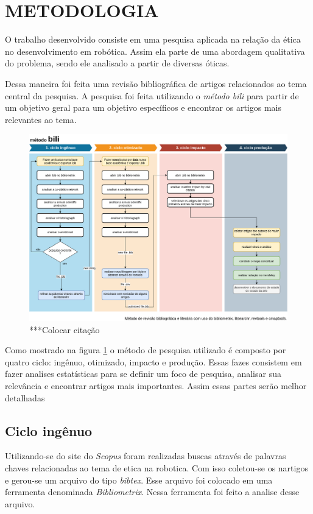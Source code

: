 \section{METODOLOGIA}

O trabalho desenvolvido consiste em uma pesquisa aplicada na relação da ética no desenvolvimento em robótica. Assim ela parte de uma abordagem qualitativa do problema, sendo ele analisado a partir de diversas óticas.

Dessa maneira foi feita uma revisão bibliográfica de artigos relacionados ao tema central da pesquisa. A pesquisa foi feita utilizando o \textit{método bili} para partir de um objetivo geral para um objetivo específicos e encontrar os artigos mais relevantes ao tema.  

\begin{figure}[h!]
   \centering
       \includegraphics[width=15cm]{source/pictures/bili.png}
   \caption{***Colocar   citação}
   \label{fig:bili}
\end{figure}

Como mostrado na figura \ref{fig:bili} o método de pesquisa utilizado é composto por quatro ciclo: ingênuo, otimizado, impacto e produção. Essas fazes consistem em fazer analises estatísticas para se definir um foco de pesquisa, analisar sua relevância e encontrar artigos mais importantes. Assim essas partes serão melhor detalhadas

\subsection{Ciclo ingênuo}
Utilizando-se do site do \textit{Scopus} foram realizadas buscas através de palavras chaves relacionadas ao tema de etica na robotica. Com isso coletou-se os nartigos e gerou-se um arquivo do tipo \textit{bibtex}. Esse arquivo foi colocado em uma ferramenta denominada \textit{Bibliometrix}. Nessa ferramenta foi feito a analise desse arquivo.

